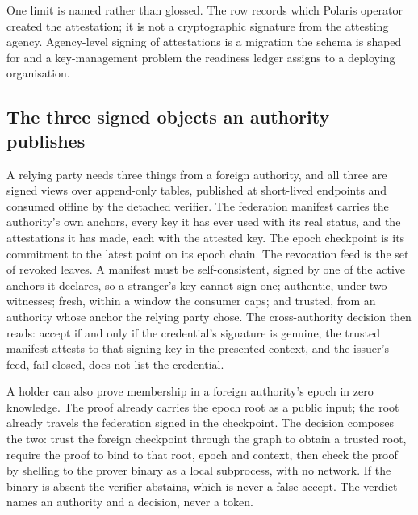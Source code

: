 One limit is named rather than glossed. The row records which Polaris operator created the
attestation; it is not a cryptographic signature from the attesting agency. Agency-level signing of
attestations is a migration the schema is shaped for and a key-management problem the readiness
ledger assigns to a deploying organisation. \sExt


\subsection{The three signed objects an authority publishes}

A relying party needs three things from a foreign authority, and all three are signed views over
append-only tables, published at short-lived endpoints and consumed offline by the detached
verifier. The federation manifest carries the authority's own anchors, every key it has ever used
with its real status, and the attestations it has made, each with the attested key. The epoch
checkpoint is its commitment to the latest point on its epoch chain. The revocation feed is the set
of revoked leaves. A manifest must be self-consistent, signed by one of the active anchors it
declares, so a stranger's key cannot sign one; authentic, under two witnesses; fresh, within a window
the consumer caps; and trusted, from an authority whose anchor the relying party chose. The
cross-authority decision then reads: accept if and only if the credential's signature is genuine,
the trusted manifest attests to that signing key in the presented context, and the issuer's feed,
fail-closed, does not list the credential. \sImpl

A holder can also prove membership in a foreign authority's epoch in zero knowledge. The proof
already carries the epoch root as a public input; the root already travels the federation signed in
the checkpoint. The decision composes the two: trust the foreign checkpoint through the graph to
obtain a trusted root, require the proof to bind to that root, epoch and context, then check the
proof by shelling to the prover binary as a local subprocess, with no network. If the binary is
absent the verifier abstains, which is never a false accept. The verdict names an authority and a
decision, never a token. \sImpl

